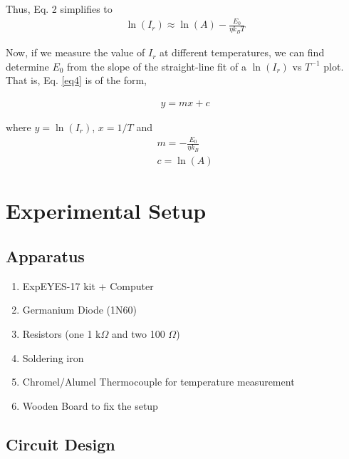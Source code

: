Thus, Eq. 2 simplifies to 
\begin{align}\label{eq4}
    \ln{(I_r)} \approx \ln(A) - \frac{E_0}{\eta k_B T}
\end{align}

Now, if we measure the value of $I_r$ at different temperatures, we can find determine $E_0$ from the slope of the straight-line fit of a $\ln(I_r)$ vs $T^{-1}$ plot. That is, Eq. \ref{eq4} is of the form,

\begin{align}
    y = mx + c
\end{align}

where $y=\ln(I_r)$, $x=1/T$ and 
\begin{align} \label{slope}
    m = -\frac{E_0}{\eta k_B}\\
    c = \ln(A)
\end{align}
\section{Experimental Setup}

\subsection{Apparatus}

\begin{enumerate}
    \item ExpEYES-17 kit + Computer
    \item Germanium Diode (1N60)
    \item Resistors (one 1 k$\Omega$ and two 100 $\Omega$)
    \item Soldering iron
    \item Chromel/Alumel Thermocouple for temperature measurement
    \item Wooden Board to fix the setup
\end{enumerate}

\subsection{Circuit Design}


